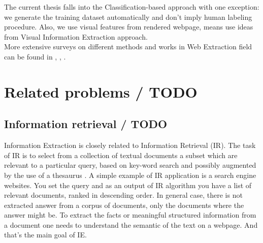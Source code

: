 The current thesis falls into the Classification-based approach with one exception: we generate the training dataset automatically and don't imply human labeling procedure. Also, we use visual features from rendered webpage, means use ideas from Visual Information Extraction approach.\\  

More extensive surveys on different methods and works in Web Extraction field can be found in \cite{WebExtraSurveyFerrara},  \cite{Trends}, \cite{WebDataSurvey}.







\section{Related problems / TODO}

\subsection{Information retrieval / TODO}

Information Extraction is closely related to Information Retrieval (IR). 
The task of IR is to select from a collection of textual documents a subset which are relevant to a particular query, based on key-word search and possibly augmented by the use of a thesaurus \cite{InfExtr}. A simple example of IR application is a search engine websites. You set the query and as an output of IR algorithm you have a list of relevant documents, ranked in descending order. In general case, there is not extracted answer from a corpus of documents, only the documents where the answer might be. To extract the facts or meaningful structured information from a document one needs to understand the semantic of the text on a webpage. And that's the main goal of IE.

